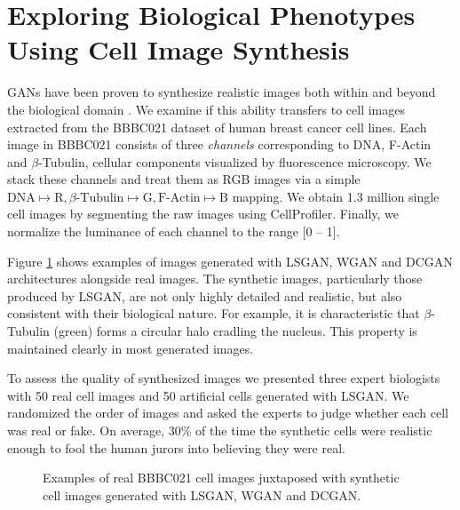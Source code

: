 \documentclass{article}
\begin{document}
\section{Exploring Biological Phenotypes Using Cell Image Synthesis}\label{synthesis}
GANs have been proven to synthesize realistic images both within and beyond the biological domain \cite{goodfellow2014generative,radford2015unsupervised,osokin2017gans}. We examine if this ability transfers to cell images extracted from the BBBC021 dataset of human breast cancer cell lines. Each image in BBBC021 consists of three \emph{channels} corresponding to DNA, F-Actin and $\beta$-Tubulin, cellular components visualized by fluorescence microscopy. We stack these channels and treat them as RGB images via a simple $\text{DNA} \mapsto \text{R}, \text{$\beta$-Tubulin} \mapsto \text{G}, \text{F-Actin} \mapsto \text{B}$ mapping. We obtain 1.3 million single cell images by segmenting the raw images using CellProfiler. Finally, we normalize the luminance of each channel to the range [0 -- 1].


Figure \ref{fig:generated} shows examples of images generated with LSGAN, WGAN
and DCGAN architectures alongside real images. The synthetic images,
particularly those produced by LSGAN, are not only highly detailed and
realistic, but also consistent with their biological nature. For example, it is
characteristic that $\beta$-Tubulin (green) forms a circular halo cradling the nucleus.
This property is maintained clearly in most generated images.

To assess the quality of synthesized images we presented three expert biologists
with 50 real cell images and 50 artificial cells generated with LSGAN. We
randomized the order of images and asked the experts to judge whether each cell
was real or fake. On average, 30\% of the time the synthetic cells were
realistic enough to fool the human jurors into believing they were real.

\begin{figure}[b]
  \centering
  \caption{Examples of real BBBC021 cell images juxtaposed with synthetic cell images generated with LSGAN, WGAN and DCGAN.}
  \label{fig:generated}
\end{figure}
\end{document}
